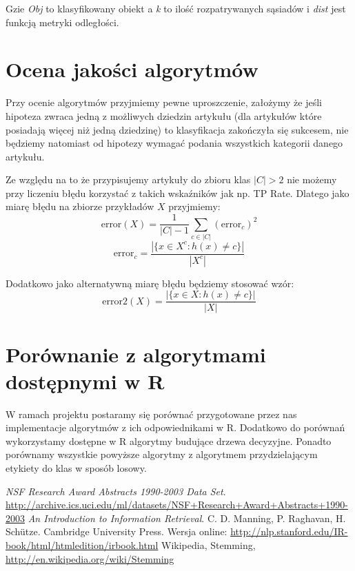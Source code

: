 \documentclass[a4paper,12pt]{article}
\begin{document}
Gzie \textit{Obj} to klasyfikowany obiekt a \textit{k} to ilość
rozpatrywanych sąsiadów i \textit{dist} jest funkcją metryki odległości.

\section{Ocena jakości algorytmów} 

Przy ocenie algorytmów przyjmiemy pewne uproszczenie,
założymy że jeśli hipoteza zwraca jedną z możliwych 
dziedzin artykułu (dla artykułów które posiadają więcej
niż jedną dziedzinę) to klasyfikacja zakończyła się sukcesem,
nie będziemy natomiast od hipotezy wymagać podania wszystkich
kategorii danego artykułu.

Ze względu na to że przypisujemy artykuły do zbioru 
klas $|C| > 2$ nie możemy przy liczeniu błędu korzystać
z takich wskaźników jak np. TP Rate.
Dlatego jako miarę błędu na zbiorze przykładów $X$ przyjmiemy:
\[ \textrm{error}(X) = \frac{1}{|C|-1} 
	\sum_{c \in |C|} (\textrm{error}_c)^2 \]
\[ \textrm{error}_c = \frac{|\{x\in X^c: h(x) \neq c\}|}{|X^c|} \]

Dodatkowo jako alternatywną miarę błędu będziemy stosować wzór:
\[ \textrm{error2}(X) = \frac{|\{x\in X: h(x) \neq c\}|}{|X|} \]


\section{Porównanie z algorytmami dostępnymi w R}

W ramach projektu postaramy się porównać
przygotowane przez nas implementacje algorytmów z
ich odpowiednikami w R. Dodatkowo do porównań
wykorzystamy dostępne w R algorytmy budujące drzewa decyzyjne.
Ponadto porównamy wszystkie powyższe algorytmy z algorytmem
przydzielającym etykiety do klas w sposób losowy.




\begin{thebibliography}{9}

   \emph{NSF Research Award Abstracts 1990-2003 Data Set}.
   \url{http://archive.ics.uci.edu/ml/datasets/NSF+Research+Award+Abstracts+1990-2003}
	\emph{An Introduction to Information Retrieval}. 
	C. D. Manning, P. Raghavan, H. Sch\"utze.
	Cambridge University Press.
	Wersja online: \url{http://nlp.stanford.edu/IR-book/html/htmledition/irbook.html}
	Wikipedia, Stemming, \url{http://en.wikipedia.org/wiki/Stemming}

\end{thebibliography}
\end{document}

